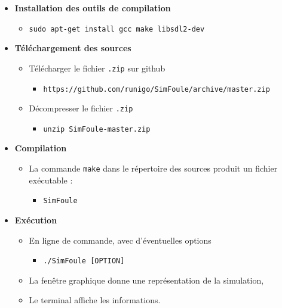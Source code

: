 \begin{itemize}[leftmargin=1cm, label=, itemsep=0pt]%
\item {\bf Installation des outils de compilation}
	\begin{itemize}[leftmargin=1cm, label=, itemsep=0pt]
	\item \texttt{sudo apt-get install gcc make libsdl2-dev}
	\end{itemize}
\item {\bf Téléchargement des sources}
	\begin{itemize}[leftmargin=1cm, label=, itemsep=0pt]
	\item Télécharger le fichier \texttt{.zip} sur github
		\begin{itemize}[leftmargin=1cm, label=, itemsep=0pt]
		\item \texttt{https://github.com/runigo/SimFoule/archive/master.zip}
		\end{itemize}
	\item Décompresser le fichier \texttt{.zip}
		\begin{itemize}[leftmargin=1cm, label=, itemsep=0pt]
		\item \texttt{unzip SimFoule-master.zip}
		\end{itemize}
	\end{itemize}
\item {\bf Compilation}
	\begin{itemize}[leftmargin=1cm, label=, itemsep=0pt]
	\item La commande \texttt{make} dans le répertoire des sources produit un fichier exécutable :
		\begin{itemize}[leftmargin=1cm, label=, itemsep=0pt]
		\item \texttt{SimFoule}
		\end{itemize}
	\end{itemize}

\item {\bf Exécution}
	\begin{itemize}[leftmargin=1cm, label=, itemsep=0pt]
	\item En ligne de commande, avec d'éventuelles options
		\begin{itemize}[leftmargin=1cm, label=, itemsep=0pt]
		\item \texttt{./SimFoule [OPTION]}
		\end{itemize}
	\item La fenêtre graphique donne une représentation de la simulation,
	\item Le terminal affiche les informations.
	\end{itemize}
\end{itemize}




